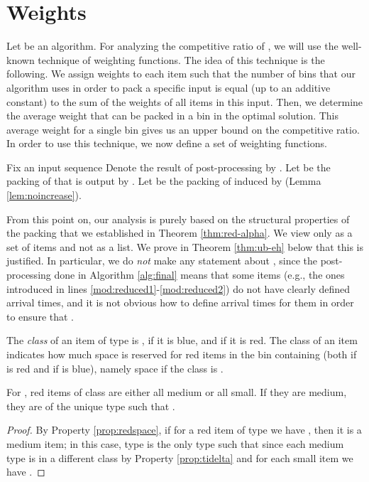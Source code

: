 \section{Weights}
Let  be an {\EHarm} algorithm.
For analyzing the competitive ratio of , we will use the well-known technique of weighting functions. The idea of this technique is the following. We assign weights to each item such that the number of bins that our algorithm uses in order to pack a specific input is equal (up to an additive constant) to the sum of the weights of all items in this input. Then, we determine the average weight that can be packed in a bin in the optimal solution. This average weight for a single bin gives us an upper bound on the competitive ratio. In order to use this technique, we now define a set of weighting functions.

Fix an input sequence 
Denote the result of post-processing  by . 
Let  be the packing of  that is output by .
Let  be the packing of  induced by  (Lemma \ref{lem:noincrease}).

From this point on, our analysis is purely based on the structural properties of the packing  that we established in Theorem \ref{thm:red-alpha}. We view  only as a set of items and not as a list. We prove in Theorem \ref{thm:ub-eh} below that this is justified. In particular, we do \emph{not} make any statement about , since the post-processing done in Algorithm \ref{alg:final} means that some items (e.g., the ones introduced in lines \ref{mod:reduced1}-\ref{mod:reduced2}) do not have clearly defined arrival times, and it is not obvious how to define arrival times for them in order to ensure that .

The \emph{class}
of an item of type  is , if it is blue, and  if it is 
red.
The class of an item  indicates how much space is reserved for red items in the bin containing 
(both if  is red and if  is blue), namely  space if the class is .

\begin{lemma}
	\label{lem:allthesame}
	For , red items of class  are either all medium or all small.
	If they are medium, they are of the unique type  such that .
\end{lemma}
\begin{proof}
	By Property \ref{prop:redspace}, if for a red item of type  we have
	, then it is a medium item; in this case, 
	type  is the only type such that
	 since each medium type is in a different class by Property \ref{prop:tidelta}
	and for each small item  we have .
\end{proof}

